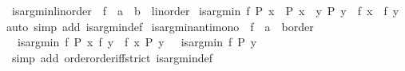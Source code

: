 \begin{isabellebody}
\isanewline
{}\isamarkupfalse%
\ is{\isacharunderscore}{\kern0pt}arg{\isacharunderscore}{\kern0pt}min{\isacharunderscore}{\kern0pt}linorder{\isacharcolon}{\kern0pt}\ \ f\ {\isacharcolon}{\kern0pt}{\isacharcolon}{\kern0pt}\ {\isachardoublequoteopen}{\isacharprime}{\kern0pt}a\ {\isasymRightarrow}\ {\isacharprime}{\kern0pt}b\ {\isacharcolon}{\kern0pt}{\isacharcolon}{\kern0pt}\ linorder{\isachardoublequoteclose}\isanewline
{}\ {\isachardoublequoteopen}is{\isacharunderscore}{\kern0pt}arg{\isacharunderscore}{\kern0pt}min\ f\ P\ x\ {\isacharequal}{\kern0pt}\ {\isacharparenleft}{\kern0pt}P\ x\ {\isasymand}\ {\isacharparenleft}{\kern0pt}{\isasymforall}y{\isachardot}{\kern0pt}\ P\ y\ {\isasymlongrightarrow}\ f\ x\ {\isasymle}\ f\ y{\isacharparenright}{\kern0pt}{\isacharparenright}{\kern0pt}{\isachardoublequoteclose}\isanewline
%
\isadelimproof
%
\endisadelimproof
%
\isatagproof
{}\isamarkupfalse%
{\isacharparenleft}{\kern0pt}auto\ simp\ add{\isacharcolon}{\kern0pt}\ is{\isacharunderscore}{\kern0pt}arg{\isacharunderscore}{\kern0pt}min{\isacharunderscore}{\kern0pt}def{\isacharparenright}{\kern0pt}%
\endisatagproof
{\isafoldproof}%
%
\isadelimproof
\isanewline
%
\endisadelimproof
\isanewline
{}\isamarkupfalse%
\ is{\isacharunderscore}{\kern0pt}arg{\isacharunderscore}{\kern0pt}min{\isacharunderscore}{\kern0pt}antimono{\isacharcolon}{\kern0pt}\ \ f\ {\isacharcolon}{\kern0pt}{\isacharcolon}{\kern0pt}\ {\isachardoublequoteopen}{\isacharprime}{\kern0pt}a\ {\isasymRightarrow}\ {\isacharparenleft}{\kern0pt}{\isacharprime}{\kern0pt}b{\isacharcolon}{\kern0pt}{\isacharcolon}{\kern0pt}order{\isacharparenright}{\kern0pt}{\isachardoublequoteclose}\isanewline
{}\ {\isachardoublequoteopen}{\isasymlbrakk}\ is{\isacharunderscore}{\kern0pt}arg{\isacharunderscore}{\kern0pt}min\ f\ P\ x{\isacharsemicolon}{\kern0pt}\ f\ y\ {\isasymle}\ f\ x{\isacharsemicolon}{\kern0pt}\ P\ y\ {\isasymrbrakk}\ {\isasymLongrightarrow}\ is{\isacharunderscore}{\kern0pt}arg{\isacharunderscore}{\kern0pt}min\ f\ P\ y{\isachardoublequoteclose}\isanewline
%
\isadelimproof
%
\endisadelimproof
%
\isatagproof
{}\isamarkupfalse%
\ {\isacharparenleft}{\kern0pt}simp\ add{\isacharcolon}{\kern0pt}\ order{\isachardot}{\kern0pt}order{\isacharunderscore}{\kern0pt}iff{\isacharunderscore}{\kern0pt}strict\ is{\isacharunderscore}{\kern0pt}arg{\isacharunderscore}{\kern0pt}min{\isacharunderscore}{\kern0pt}def{\isacharparenright}{\kern0pt}%
\endisatagproof
{\isafoldproof}%
%
\isadelimproof
\isanewline
%
\endisadelimproof

\end{isabellebody}
